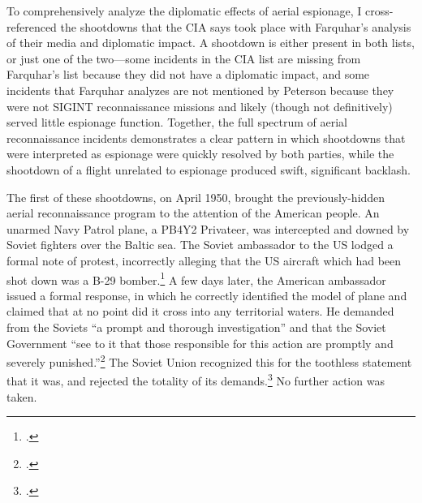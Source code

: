 \documentclass[14pt]{extarticle}
\begin{document}
To comprehensively analyze the diplomatic effects of aerial espionage, I cross-referenced the shootdowns that the CIA says took place with Farquhar's analysis of their media and diplomatic impact. A shootdown is either present in both lists, or just one of the two---some incidents in the CIA list are missing from Farquhar's list because they did not have a diplomatic impact, and some incidents that Farquhar analyzes are not mentioned by Peterson because they were not SIGINT reconnaissance missions and likely (though not definitively) served little espionage function. Together, the full spectrum of aerial reconnaissance incidents demonstrates a clear pattern in which shootdowns that were interpreted as espionage were quickly resolved by both parties, while the shootdown of a flight unrelated to espionage produced swift, significant backlash.

The first of these shootdowns, on April 1950, brought the previously-hidden aerial reconnaissance program to the attention of the American people. An unarmed Navy Patrol plane, a PB4Y2 Privateer, was intercepted and downed by Soviet fighters over the Baltic sea. The Soviet ambassador to the US lodged a formal note of protest, incorrectly alleging that the US aircraft which had been shot down was a B-29 bomber.\footcite{kirk_ambassador_1950} A few days later, the American ambassador issued a formal response, in which he correctly identified the model of plane and claimed that at no point did it cross into any territorial waters. He demanded from the Soviets \enquote{a prompt and thorough investigation} and that the Soviet Government \enquote{see to it that those responsible for this action are promptly and severely punished.}\footcite{the_associated_press_text_1950} The Soviet Union recognized this for the toothless statement that it was, and rejected the totality of its demands.\footcite{salisbury_kremlin_1950} No further action was taken.
\end{document}
